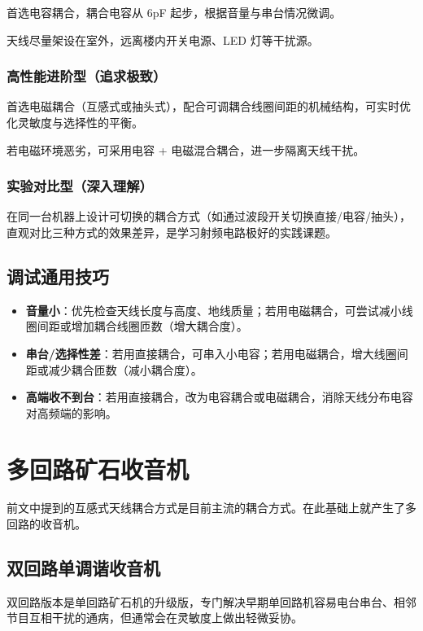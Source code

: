 \documentclass[12pt,UTF8]{ctexbook}
\begin{document}
首选电容耦合，耦合电容从 6pF 起步，根据音量与串台情况微调。

天线尽量架设在室外，远离楼内开关电源、LED 灯等干扰源。

\subsection{高性能进阶型（追求极致）}

首选电磁耦合（互感式或抽头式），配合可调耦合线圈间距的机械结构，可实时优化灵敏度与选择性的平衡。

若电磁环境恶劣，可采用电容 + 电磁混合耦合，进一步隔离天线干扰。

\subsection{实验对比型（深入理解）}

在同一台机器上设计可切换的耦合方式（如通过波段开关切换直接/电容/抽头），直观对比三种方式的效果差异，是学习射频电路极好的实践课题。

\section{调试通用技巧}

\begin{itemize}[leftmargin=2cm]
	\item \textbf{音量小}：优先检查天线长度与高度、地线质量；若用电磁耦合，可尝试减小线圈间距或增加耦合线圈匝数（增大耦合度）。
	\item \textbf{串台/选择性差}：若用直接耦合，可串入小电容；若用电磁耦合，增大线圈间距或减少耦合匝数（减小耦合度）。
	\item \textbf{高端收不到台}：若用直接耦合，改为电容耦合或电磁耦合，消除天线分布电容对高频端的影响。
\end{itemize}


\chapter{多回路矿石收音机}
\label{chap:multi-loop-radio}

前文中提到的互感式天线耦合方式是目前主流的耦合方式。在此基础上就产生了多回路的收音机。

\section{双回路单调谐收音机}

双回路版本是单回路矿石机的升级版，专门解决早期单回路机容易电台串台、相邻节目互相干扰的通病，但通常会在灵敏度上做出轻微妥协。
\end{document}
